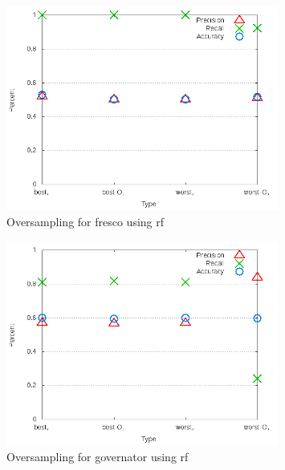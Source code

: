 \begin{figure}[!t]
\centering
\includegraphics[width=0.8\textwidth]{images/rf/test_4/fresco_sample_range.png}
\caption{Oversampling for fresco using \gls{rf}}
\label{fig:test_4_fresco_rf}
\end{figure}

\begin{figure}[!t]
\centering
\includegraphics[width=0.8\textwidth]{images/rf/test_4/governator_sample_range.png}
\caption{Oversampling for governator using \gls{rf}}
\label{fig:test_4_governator_rf}
\end{figure}

